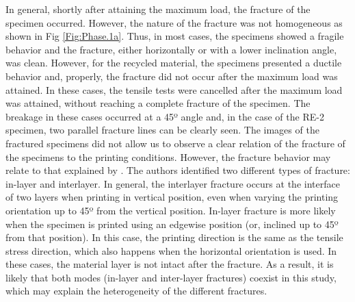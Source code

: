 \documentclass[]{interact}
\theoremstyle{plain}%
\theoremstyle{definition}
\theoremstyle{remark}
\begin{document}
In general, shortly after attaining the maximum load, the fracture of
the specimen occurred. However, the nature of the fracture was not
homogeneous as shown in Fig \ref{Fig:Phase.1a}. Thus, in most cases, the
specimens showed a fragile behavior and the fracture, either
horizontally or with a lower inclination angle, was clean. However, for
the recycled material, the specimens presented a ductile behavior and,
properly, the fracture did not occur after the maximum load was
attained. In these cases, the tensile tests were cancelled after the
maximum load was attained, without reaching a complete fracture of the
specimen. The breakage in these cases occurred at a 45º angle and, in
the case of the RE-2 specimen, two parallel fracture lines can be
clearly seen. The images of the fractured specimens did not allow us to
observe a clear relation of the fracture of the specimens to the
printing conditions. However, the fracture behavior may relate to that
explained by \citet{Yao2019}. The authors identified two different types
of fracture: in-layer and interlayer. In general, the interlayer
fracture occurs at the interface of two layers when printing in vertical
position, even when varying the printing orientation up to 45º from the
vertical position. In-layer fracture is more likely when the specimen is
printed using an edgewise position (or, inclined up to 45º from that
position). In this case, the printing direction is the same as the
tensile stress direction, which also happens when the horizontal
orientation is used. In these cases, the material layer is not intact
after the fracture. As a result, it is likely that both modes (in-layer
and inter-layer fractures) coexist in this study, which may explain the
heterogeneity of the different fractures.
\end{document}
